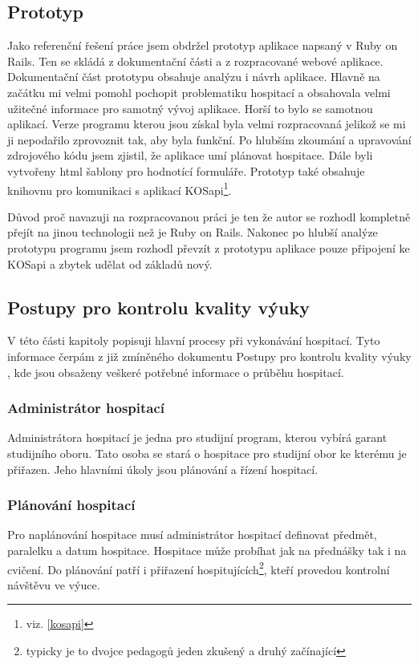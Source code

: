 \subsection{Prototyp}

Jako referenční řešení práce jsem obdržel prototyp aplikace napsaný v Ruby on Rails. Ten se skládá z dokumentační části a z rozpracované webové aplikace. Dokumentační část prototypu obsahuje analýzu i návrh aplikace. Hlavně na začátku mi velmi pomohl pochopit problematiku hospitací a obsahovala velmi užitečné informace pro samotný vývoj aplikace. Horší to bylo se samotnou aplikací. Verze programu kterou jsou získal byla velmi rozpracovaná jelikož se mi ji nepodařilo zprovoznit tak, aby byla funkční. Po hlubším zkoumání a upravování zdrojového kódu jsem zjistil, že aplikace umí plánovat hospitace. Dále byli vytvořeny html šablony pro hodnotící formuláře. Prototyp také obsahuje knihovnu pro komunikaci s aplikací KOSapi\footnote{viz. \ref{kosapi}}.

Důvod proč navazuji na rozpracovanou práci je ten že autor se  rozhodl kompletně přejít na jinou technologii než je Ruby on Rails. Nakonec po hlubší analýze prototypu programu jsem rozhodl převzít z prototypu aplikace pouze připojení ke KOSapi a zbytek udělat od základů nový. 

\subsection{Postupy pro kontrolu kvality výuky}
V této části kapitoly popisuji hlavní procesy při vykonávání hospitací. Tyto informace čerpám z již zmíněného dokumentu Postupy pro kontrolu kvality výuky \cite{postupy}, kde jsou obsaženy veškeré potřebné informace o průběhu hospitací.

\subsubsection{Administrátor hospitací}
Administrátora hospitací je jedna pro studijní program, kterou vybírá garant studijního oboru. Tato osoba se stará o hospitace pro studijní obor ke kterému je přiřazen. Jeho hlavními úkoly jsou plánování a řízení hospitací.

\subsubsection{Plánování hospitací}
Pro naplánování hospitace musí administrátor hospitací definovat předmět, paralelku a datum hospitace. Hospitace může probíhat jak na přednášky tak i na cvičení. Do plánování patří i přiřazení hospitujících\footnote{typicky je to dvojce pedagogů jeden zkušený a druhý začínající}, kteří provedou kontrolní návštěvu ve výuce.

